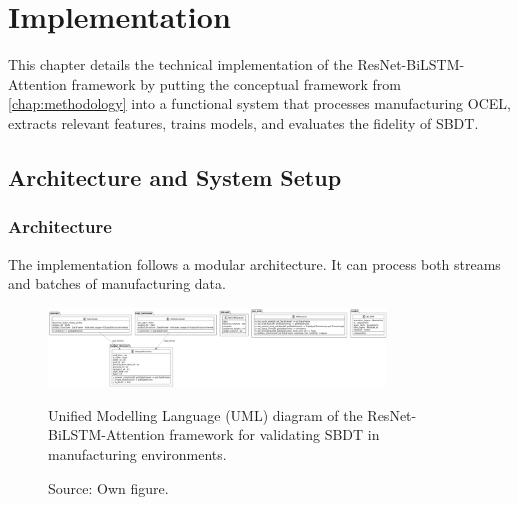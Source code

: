 \chapter{Implementation}
\label{chap:implementation}
This chapter details the technical implementation of the ResNet-BiLSTM-Attention framework \autocite{Fischer2025ResNetBiLSTM} by putting the conceptual framework from \autoref{chap:methodology} into a functional system that processes manufacturing OCEL, extracts relevant features, trains models, and evaluates the fidelity of SBDT.

\section{Architecture and System Setup}

\subsection{Architecture}
The implementation follows a modular architecture. It can process both streams and batches of manufacturing data.

\begin{figure}[htbp]
  \centering
  \includegraphics[width=0.8\textwidth]{figures/code.png}
  \caption{Unified Modelling Language (UML) diagram of the ResNet-BiLSTM-Attention framework for validating SBDT in manufacturing environments.}
  \caption*{Source: Own figure.}
  \label{fig:uml-diagram}
\end{figure}

